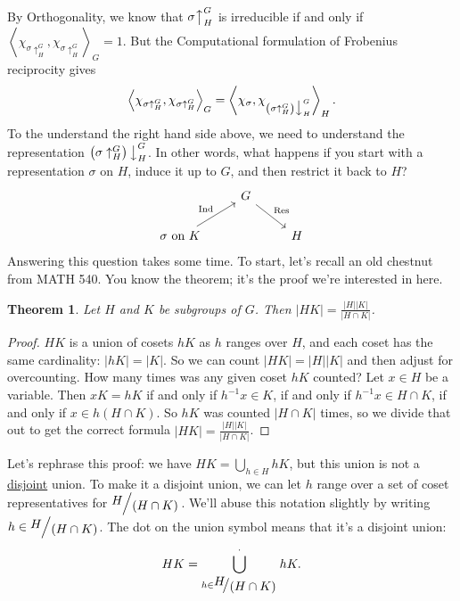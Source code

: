 \documentclass[12pt]{article}
\newcommand\inv[1]{#1^{-1}}
\newcommand\paren[1]{\left( #1 \right)}
\newcommand{\vbrack}[1]{\left \langle #1 \right \rangle}
\newcommand{\quotient}[2]{{\makebox[\width-2.3pt][l]{\raisebox{.2em}{$#1$}}\left/\raisebox{-.2em}{$#2$}\right.}}
\newtheorem{theorem}{Theorem}[section]
\theoremstyle{definition}
\begin{document}
By Orthogonality, we know that $\sigma \big\uparrow_H^G$ is irreducible if and only if $\vbrack{ \chi_{\sigma \uparrow_H^G} , \chi_{\sigma \uparrow_H^G} }_G = 1$. But the Computational formulation of Frobenius reciprocity gives
\begin{equation}
    \vbrack{ \chi_{\sigma \uparrow_H^G} , \chi_{\sigma \uparrow_H^G} }_G = \vbrack{ \chi_{\sigma} , \chi_{ \paren{ \sigma \uparrow_H^G }\big\downarrow^G_H } }_H.
\end{equation}
To the understand the right hand side above, we need to understand the representation $\paren{ \sigma \uparrow_H^G }\big\downarrow^G_H$. In other words, what happens if you start with a representation $\sigma$ on $H$, induce it up to $G$, and then restrict it back to $H$?
\begin{equation}
    \begin{tikzcd}
         & G \arrow[dr,"\mathrm{Res}"] & \\
        \text{$\sigma$ on $K$}\arrow[ur,"\mathrm{Ind}"] & & H
    \end{tikzcd}
\end{equation}
Answering this question takes some time. To start, let's recall an old chestnut from MATH 540. You know the theorem; it's the proof we're interested in here.
\begin{theorem}
    Let $H$ and $K$ be subgroups of $G$. Then $|HK| = \frac{|H||K|}{|H \cap K|}$.
\end{theorem}
\begin{proof}
    $HK$ is a union of cosets $hK$ as $h$ ranges over $H$, and each coset has the same cardinality: $|hK| = |K|$. So we can count $|HK| = |H||K|$ and then adjust for overcounting. How many times was any given coset $hK$ counted? Let $x \in H$ be a variable. Then $xK = hK$ if and only if $\inv{h}x \in K$, if and only if $\inv{h}x \in H \cap K$, if and only if $x \in h \paren{ H \cap K }$. So $hK$ was counted $|H \cap K|$ times, so we divide that out to get the correct formula $|HK| = \frac{|H||K|}{|H \cap K|}$.
\end{proof}
Let's rephrase this proof: we have $HK = \bigcup\limits_{h \in H} hK$, but this union is not a \underline{disjoint} union. To make it a disjoint union, we can let $h$ range over a set of coset representatives for $\quotient{H}{(H \cap K)}$. We'll abuse this notation slightly by writing $h \in \quotient{H}{(H \cap K)}$. The dot on the union symbol means that it's a disjoint union:
\begin{equation}
    HK = \bigcup\limits_{h \in \quotient{H}{(H \cap K)}}^{\cdot} hK.
\end{equation}
\end{document}
